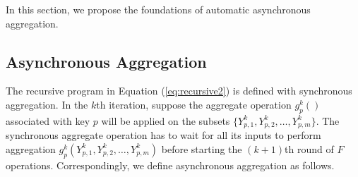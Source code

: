 In this section, we propose the foundations of automatic asynchronous aggregation.

\subsection{Asynchronous Aggregation}
\label{sec:async:async}

The recursive program in Equation (\ref{eq:recursive2}) is defined with synchronous aggregation. In the $k$th iteration, suppose the aggregate operation $g_{p}^k()$ associated with key $p$ will be applied on the subsets $\{Y_{p,1}^k,Y_{p,2}^k,\ldots,Y_{p,m}^k\}$. The synchronous aggregate operation has to wait for all its inputs to perform aggregation $g_{p}^k(Y_{p,1}^k,Y_{p,2}^k,\ldots,Y_{p,m}^k)$ before starting the $(k+1)$th round of $F$ operations. Correspondingly, we define asynchronous aggregation as follows.
 


